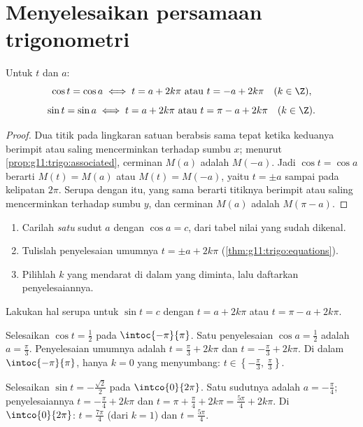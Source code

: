\section{Menyelesaikan persamaan trigonometri}

\begin{theorem}[Persamaan $\cos t = \cos a$ dan $\sin t = \sin a$]
\label{thm:g11:trigo:equations}
Untuk  $t$ dan $a$:
\[
\cos t = \cos a \iff t = a + 2k\pi \ \text{atau}\ t = -a + 2k\pi
\quad (k \in \Z),
\]
\[
\sin t = \sin a \iff t = a + 2k\pi \ \text{atau}\ t = \pi - a + 2k\pi
\quad (k \in \Z).
\]
\end{theorem}

\begin{proof}
Dua titik pada lingkaran satuan berabsis sama tepat ketika keduanya
berimpit atau saling mencerminkan terhadap sumbu $x$; menurut
\cref{prop:g11:trigo:associated}, cerminan $M(a)$ adalah $M(-a)$. Jadi
$\cos t = \cos a$ berarti $M(t) = M(a)$ atau $M(t) = M(-a)$, yaitu
$t = \pm a$ sampai pada kelipatan $2\pi$. Serupa dengan itu,  yang sama
berarti titiknya berimpit atau saling mencerminkan terhadap sumbu $y$, dan
cerminan $M(a)$ adalah $M(\pi - a)$.
\end{proof}

\begin{method}[Menyelesaikan $\cos t = c$ pada sebuah interval]\label{met:g11:trigo:solve}
\begin{enumerate}
  \item Carilah \emph{satu} sudut $a$ dengan $\cos a = c$, dari tabel
        nilai yang sudah dikenal.
  \item Tulislah penyelesaian umumnya $t = \pm a + 2k\pi$
        (\cref{thm:g11:trigo:equations}).
  \item Pilihlah  $k$ yang mendarat di dalam  yang
        diminta, lalu daftarkan penyelesaiannya.
\end{enumerate}
Lakukan hal serupa untuk $\sin t = c$ dengan $t = a + 2k\pi$ atau
$t = \pi - a + 2k\pi$.
\end{method}

\begin{example}\label{ex:g11:trigo:solve}
Selesaikan $\cos t = \frac12$ pada $\intoc{-\pi}{\pi}$. Satu penyelesaian
$\cos a = \frac12$ adalah $a = \frac{\pi}{3}$. Penyelesaian umumnya adalah
$t = \frac\pi3 + 2k\pi$ dan $t = -\frac\pi3 + 2k\pi$. Di dalam
$\intoc{-\pi}{\pi}$, hanya $k = 0$ yang menyumbang:
$t \in \left\{-\frac\pi3,\ \frac\pi3\right\}$.

Selesaikan $\sin t = -\frac{\sqrt2}{2}$ pada $\intco{0}{2\pi}$. Satu sudutnya
adalah $a = -\frac\pi4$; penyelesaiannya $t = -\frac\pi4 + 2k\pi$ dan
$t = \pi + \frac\pi4 + 2k\pi = \frac{5\pi}{4} + 2k\pi$. Di
$\intco{0}{2\pi}$: $t = \frac{7\pi}{4}$ (dari $k = 1$) dan
$t = \frac{5\pi}{4}$.
\end{example}

